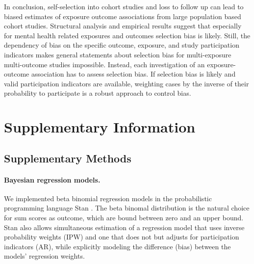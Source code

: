 \documentclass[]{article}
\begin{document}
In conclusion, self-selection into cohort studies and loss to follow up can lead to biased estimates of exposure outcome associations from large population based cohort studies. Structural analysis and empirical results suggest that especially for mental health related exposures and outcomes selection bias is likely. Still, the dependency of bias on the specific outcome, exposure, and study participation indicators makes general statements about selection bias for multi-exposure multi-outcome studies impossible. Instead, each  investigation of an exposure-outcome association has to assess selection bias. If selection bias is likely and valid participation indicators are available, weighting cases by the inverse of their probability to participate is a robust approach to control bias.

\newpage

\printbibliography

\newpage

\processdelayedfloats

\clearpage

\makeatletter
\efloat@restorefloats
\makeatother

\appendix

\renewcommand{\thefigure}{S\arabic{figure}}
\renewcommand{\thepostfigure}{S\arabic{postfigure}}
\setcounter{figure}{0}
\setcounter{postfigure}{0}

\renewcommand{\thetable}{S\arabic{table}}
\renewcommand{\theposttable}{S\arabic{posttable}}
\setcounter{table}{0}
\setcounter{posttable}{0}

\section{Supplementary Information}

\subsection{Supplementary Methods}

\paragraph{Bayesian regression models.} 
We implemented beta binomial regression models in the probabilistic programming language Stan \supercite{Carpenter2017-gd, Stan_Development_Team2017-lp}. The beta binomal distribution is the natural choice for sum scores as outcome, which are bound between zero and an upper bound. Stan also allows simultaneous estimation of a regression model that uses inverse probability weights (IPW) and one that does not but adjusts for participation indicators (AR), while explicitly modeling the difference (bias) between the models' regression weights.
\end{document}
